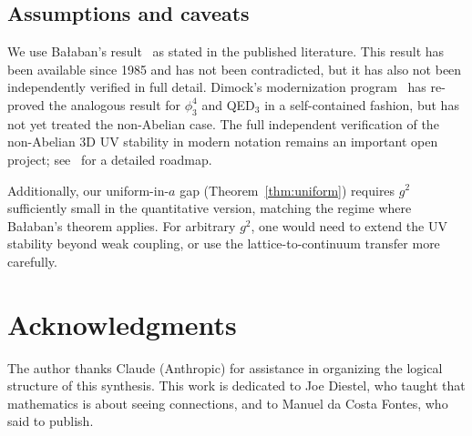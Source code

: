 \documentclass[11pt,a4paper]{article}
\theoremstyle{plain}
\theoremstyle{definition}
\theoremstyle{remark}
\begin{document}
\subsection{Assumptions and caveats}

We use Ba{\l}aban's result~\cite{Bal85e} as stated
in the published literature. This result has been
available since 1985 and has not been contradicted,
but it has also not been independently verified in
full detail. Dimock's modernization
program~\cite{Dimock13a,Dimock13b,Dimock14,Dimock22}
has re-proved the analogous result for $\phi^4_3$ and
QED$_3$ in a self-contained fashion, but has not yet
treated the non-Abelian case. The full independent
verification of the non-Abelian 3D UV stability in
modern notation remains an important open project;
see~\cite{FontesDimock} for a detailed roadmap.

Additionally, our uniform-in-$a$ gap
(Theorem~\ref{thm:uniform}) requires $g^2$
sufficiently small in the quantitative version,
matching the regime where Ba{\l}aban's theorem applies.
For arbitrary $g^2$, one would need to extend the
UV stability beyond weak coupling, or use the
lattice-to-continuum transfer more carefully.

\section*{Acknowledgments}

The author thanks Claude (Anthropic) for assistance
in organizing the logical structure of this synthesis.
This work is dedicated to Joe Diestel, who taught that
mathematics is about seeing connections, and to Manuel
da Costa Fontes, who said to publish.
\end{document}

